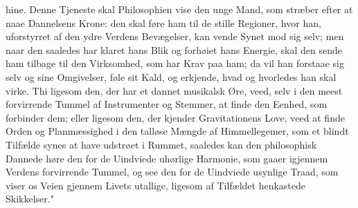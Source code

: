 \documentclass[12pt]{book}
\begin{document}
hine. Denne Tjeneste skal Philosophien vise den unge Mand, som stræber efter at
naae Dannelsens Krone: den skal føre ham til de stille Regioner, hvor han,
uforstyrret af den ydre Verdens Bevægelser, kan vende Synet mod sig selv; men naar
den saaledes har klaret hans Blik og forhøiet hans Energie, skal den sende ham
tilbage til den Virksomhed, som har Krav paa ham; da vil han forstaae sig selv og
sine Omgivelser, føle sit Kald, og erkjende, hvad og hvorledes han skal virke. Thi
ligesom den, der har et dannet musikalsk Øre, veed, selv i den meest forvirrende
Tummel af Instrumenter og Stemmer, at finde den Eenhed, som forbinder dem; eller
ligesom den, der kjender Gravitationens Love, veed at finde Orden og Planmæssighed
i den talløse Mængde af Himmellegemer, som et blindt Tilfælde synes at have
udstrøet i Rummet, saaledes kan den philosophisk
Dannede høre den for de Uindviede uhørlige Harmonie, som gaaer igjennem Verdens
forvirrende Tummel, og see den for de Uindviede usynlige Traad, som viser os Veien
gjennem Livets utallige, ligesom af Tilfældet henkastede Skikkelser."
\end{document}
